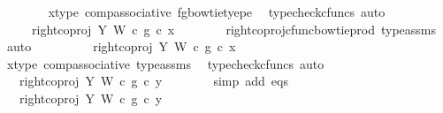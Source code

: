 \begin{isabellebody}
\ \ \ \ \ \ \isamarkupfalse%
\ x{\isacharunderscore}{\kern0pt}type{}\ comp{\isacharunderscore}{\kern0pt}associative{}\ fg{\isacharunderscore}{\kern0pt}bowtie{\isacharunderscore}{\kern0pt}tyepe\ \isamarkupfalse%
\ {\isacharparenleft}{\kern0pt}typecheck{\isacharunderscore}{\kern0pt}cfuncs{\isacharcomma}{\kern0pt}\ auto{\isacharparenright}{\kern0pt}\isanewline
\ \ \ \ \isamarkupfalse%
\ \isamarkupfalse%
\ \ {\isachardoublequoteopen}{\isachardot}{\kern0pt}{\isachardot}{\kern0pt}{\isachardot}{\kern0pt}\ {\isacharequal}{\kern0pt}\ \ {\isacharparenleft}{\kern0pt}right{\isacharunderscore}{\kern0pt}coproj\ Y\ W\ {\isasymcirc}\isactrlsub c\ g{\isacharparenright}{\kern0pt}\ {\isasymcirc}\isactrlsub c\ x{\isachardoublequoteclose}\isanewline
\ \ \ \ \ \ \isamarkupfalse%
\ right{\isacharunderscore}{\kern0pt}coproj{\isacharunderscore}{\kern0pt}cfunc{\isacharunderscore}{\kern0pt}bowtie{\isacharunderscore}{\kern0pt}prod\ type{\isacharunderscore}{\kern0pt}assms\ \isamarkupfalse%
\ auto\isanewline
\ \ \ \ \isamarkupfalse%
\ \isamarkupfalse%
\ {\isachardoublequoteopen}{\isachardot}{\kern0pt}{\isachardot}{\kern0pt}{\isachardot}{\kern0pt}\ {\isacharequal}{\kern0pt}\ right{\isacharunderscore}{\kern0pt}coproj\ Y\ W\ {\isasymcirc}\isactrlsub c\ g\ {\isasymcirc}\isactrlsub c\ x{\isachardoublequoteclose}\isanewline
\ \ \ \ \ \ \isamarkupfalse%
\ x{\isacharunderscore}{\kern0pt}type{}\ comp{\isacharunderscore}{\kern0pt}associative{}\ type{\isacharunderscore}{\kern0pt}assms{\isacharparenleft}{\kern0pt}{}{\isacharparenright}{\kern0pt}\ \isamarkupfalse%
\ {\isacharparenleft}{\kern0pt}typecheck{\isacharunderscore}{\kern0pt}cfuncs{\isacharcomma}{\kern0pt}\ auto{\isacharparenright}{\kern0pt}\isanewline
\ \ \ \ \isamarkupfalse%
\ \isamarkupfalse%
\ {\isachardoublequoteopen}{\isachardot}{\kern0pt}{\isachardot}{\kern0pt}{\isachardot}{\kern0pt}\ {\isacharequal}{\kern0pt}\ right{\isacharunderscore}{\kern0pt}coproj\ Y\ W\ {\isasymcirc}\isactrlsub c\ g\ {\isasymcirc}\isactrlsub c\ y{\isachardoublequoteclose}\isanewline
\ \ \ \ \ \ \isamarkupfalse%
\ {\isacharparenleft}{\kern0pt}simp\ add{\isacharcolon}{\kern0pt}\ eqs{\isacharparenright}{\kern0pt}\isanewline
\ \ \ \ \isamarkupfalse%
\ \isamarkupfalse%
\ {\isachardoublequoteopen}{\isachardot}{\kern0pt}{\isachardot}{\kern0pt}{\isachardot}{\kern0pt}\ {\isacharequal}{\kern0pt}\ {\isacharparenleft}{\kern0pt}right{\isacharunderscore}{\kern0pt}coproj\ Y\ W\ {\isasymcirc}\isactrlsub c\ g{\isacharparenright}{\kern0pt}\ {\isasymcirc}\isactrlsub c\ y{\isachardoublequoteclose}\isanewline

\end{isabellebody}
